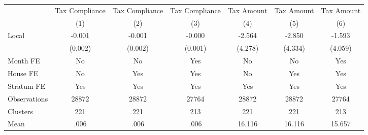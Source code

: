 {
\def\sym#1{\ifmmode^{#1}\else\(^{#1}\)\fi}
\begin{tabular}{l*{6}{c}}
\hline\hline
                &\multicolumn{1}{c}{Tax Compliance}&\multicolumn{1}{c}{Tax Compliance}&\multicolumn{1}{c}{Tax Compliance}&\multicolumn{1}{c}{Tax Amount}&\multicolumn{1}{c}{Tax Amount}&\multicolumn{1}{c}{Tax Amount}\\
                &\multicolumn{1}{c}{(1)}         &\multicolumn{1}{c}{(2)}         &\multicolumn{1}{c}{(3)}         &\multicolumn{1}{c}{(4)}         &\multicolumn{1}{c}{(5)}         &\multicolumn{1}{c}{(6)}         \\
\hline
Local           &   -0.001         &   -0.001         &   -0.000         &   -2.564         &   -2.850         &   -1.593         \\
                &  (0.002)         &  (0.002)         &  (0.001)         &  (4.278)         &  (4.334)         &  (4.059)         \\
Month FE        &       No         &       No         &      Yes         &       No         &       No         &      Yes         \\
House FE        &       No         &      Yes         &      Yes         &       No         &      Yes         &      Yes         \\
Stratum FE      &      Yes         &      Yes         &      Yes         &      Yes         &      Yes         &      Yes         \\
\hline
Observations    &    28872         &    28872         &    27764         &    28872         &    28872         &    27764         \\
Clusters        &      221         &      221         &      213         &      221         &      221         &      213         \\
Mean            &     .006         &     .006         &     .006         &   16.116         &   16.116         &   15.657         \\
\hline\hline
\end{tabular}
}
